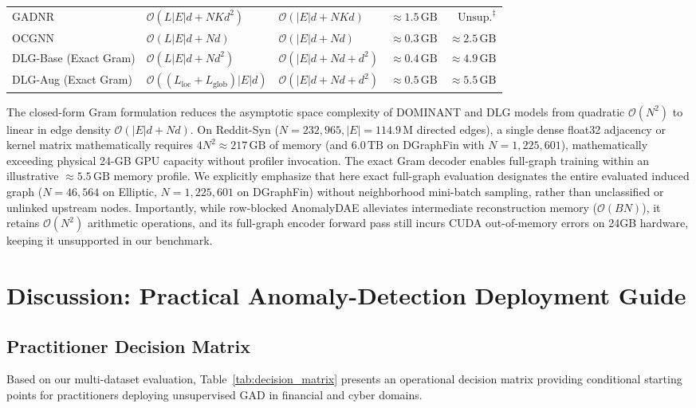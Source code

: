 \documentclass[applsci,article,submit,moreauthors,pdftex]{Definitions/mdpi}
\begin{document}
\begin{table}[htbp]
\begin{tabularx}{\textwidth}{lXXrr}
GADNR & $\mathcal{O}(L |E| d + N K d^2)$ & $\mathcal{O}(|E| d + N K d)$ & $\approx 1.5\,\mathrm{GB}$ & $\mathrm{Unsup.}^\ddagger$ \\
OCGNN & $\mathcal{O}(L |E| d + N d)$ & $\mathcal{O}(|E| d + N d)$ & $\approx 0.3\,\mathrm{GB}$ & $\approx 2.5\,\mathrm{GB}$ \\
DLG-Base (Exact Gram) & $\mathcal{O}(L |E| d + N d^2)$ & $\mathcal{O}(|E| d + N d + d^2)$ & $\approx 0.4\,\mathrm{GB}$ & $\approx 4.9\,\mathrm{GB}$ \\
DLG-Aug (Exact Gram) & $\mathcal{O}((L_{\mathrm{loc}} + L_{\mathrm{glob}}) |E| d)$ & $\mathcal{O}(|E| d + N d + d^2)$ & $\approx 0.5\,\mathrm{GB}$ & $\approx 5.5\,\mathrm{GB}$ \\\bottomrule
\end{tabularx}
\end{table}

The closed-form Gram formulation reduces the asymptotic space complexity of DOMINANT and DLG models from quadratic $\mathcal{O}(N^2)$ to linear in edge density $\mathcal{O}(|E| d + N d)$. On Reddit-Syn ($N=232,965, |E|=114.9\,\mathrm{M}$ directed edges), a single dense float32 adjacency or kernel matrix mathematically requires $4 N^2 \approx 217\,\mathrm{GB}$ of memory (and $6.0\,\mathrm{TB}$ on DGraphFin with $N=1,225,601$), mathematically exceeding physical 24-GB GPU capacity without profiler invocation. The exact Gram decoder enables full-graph training within an illustrative $\approx 5.5\,\mathrm{GB}$ memory profile. We explicitly emphasize that here exact full-graph evaluation designates the entire evaluated induced graph ($N=46,564$ on Elliptic, $N=1,225,601$ on DGraphFin) without neighborhood mini-batch sampling, rather than unclassified or unlinked upstream nodes. Importantly, while row-blocked AnomalyDAE alleviates intermediate reconstruction memory ($\mathcal{O}(B N)$), it retains $\mathcal{O}(N^2)$ arithmetic operations, and its full-graph encoder forward pass still incurs CUDA out-of-memory errors on 24GB hardware, keeping it unsupported in our benchmark.

\section{Discussion: Practical Anomaly-Detection Deployment Guide}
\label{sec:discussion}

\subsection{Practitioner Decision Matrix}
Based on our multi-dataset evaluation, Table~\ref{tab:decision_matrix} presents an operational decision matrix providing conditional starting points for practitioners deploying unsupervised GAD in financial and cyber domains.
\end{document}
